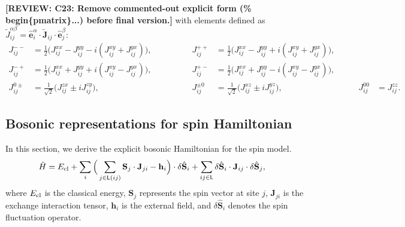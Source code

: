 \documentclass[aps, prx, nofootinbib, superscriptaddress]{revtex4-2}
\newcommand{\REVIEW}[1]{{\color{reviewcolor}\bfseries [REVIEW: #1]}}
\begin{document}
\REVIEW{C23: Remove commented-out explicit form (\% begin\{pmatrix\}...) before final version.}
with elements defined as $\widetilde{J}_{ij}^{\alpha\beta} = \hat{\mathbf{e}}_i^{\alpha} \cdot \widetilde{\mathbf{J}}_{ij} \cdot \hat{\mathbf{e}}_j^{\beta}$:
\begin{equation}\label{eq: expressions for exchange couplings}
    \begin{array}{rlrlrl}
        J_{ij}^{--} &= \frac{1}{2} \big( J_{ij}^{xx} - J_{ij}^{yy} - i (J_{ij}^{xy} + J_{ij}^{yx}) \big), \qquad \qquad &
        J_{ij}^{++} &= \frac{1}{2} \big( J_{ij}^{xx} - J_{ij}^{yy} + i (J_{ij}^{xy} + J_{ij}^{yx}) \big), &&\\[0.25em]
        J_{ij}^{-+} &= \frac{1}{2} \big( J_{ij}^{xx} + J_{ij}^{yy} + i (J_{ij}^{xy} - J_{ij}^{yx}) \big), \qquad &
        J_{ij}^{+-} &= \frac{1}{2} \big( J_{ij}^{xx} + J_{ij}^{yy} - i (J_{ij}^{xy} - J_{ij}^{yx}) \big), &&\\[0.25em]
        J_{ij}^{0\pm} &= \frac{1}{\sqrt{2}} \big( J_{ij}^{zx} \pm i J_{ij}^{zy} \big), &
        J_{ij}^{\pm0} &= \frac{1}{\sqrt{2}} \big( J_{ij}^{xz} \pm i J_{ij}^{yz} \big), & \qquad
        J_{ij}^{00} &= J_{ij}^{zz}.
    \end{array}
\end{equation}





\subsection{Bosonic representations for spin Hamiltonian}\label{subsec: Bosonic representations for spin exchange Hamiltonian}

In this section, we derive the explicit bosonic Hamiltonian for the spin model.
\begin{equation}
    \begin{split}
        \hat{H} 
        &= E_{\rm cl}
        + \sum_{i} \Big( \sum_{j \in \mathsf{L}(ij)} \mathbf{S}_{j} \cdot \mathbf{J}_{ji} - \mathbf{h}_{i} \Big) \cdot \delta \hat{\mathbf{S}}_{i}
        + \sum_{ij \in \mathsf{L}} \delta \hat{\mathbf{S}}_{i} \cdot \mathbf{J}_{ij} \cdot \delta \hat{\mathbf{S}}_{j},
    \end{split}
\end{equation}
where $E_{\rm cl}$ is the classical energy, $\mathbf{S}_{j}$ represents the spin vector at site $j$, $\mathbf{J}_{ji}$ is the exchange interaction tensor, $\mathbf{h}_{i}$ is the external field, and $\delta \hat{\mathbf{S}}_{i}$ denotes the spin fluctuation operator.
\end{document}
